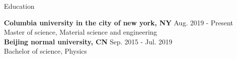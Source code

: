 \documentclass{resume} %
\begin{document}

\begin{rSection}{Education}

{\bf Columbia university in the city of new york, NY} \hfill { Aug. 2019 - Present} 
\\ Master of science, Material science and engineering
\\
{\bf Beijing normal university, CN} \hfill { Sep. 2015 - Jul. 2019} 
\\ Bachelor of science, Physics

\end{rSection}
\end{document}
